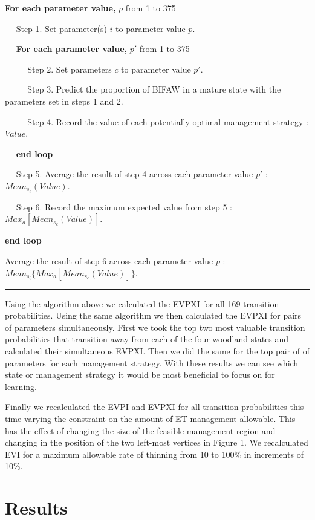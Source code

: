 \documentclass[]{article}
\begin{document}
\textbf{For each parameter value,} \(p\) from 1 to 375

\(\quad\) Step 1. Set parameter(s) \(i\) to parameter value \(p\).

\(\quad\) \textbf{For each parameter value,} \(p'\) from 1 to 375

\(\quad\) \(\quad\) Step 2. Set parameters \(c\) to parameter value
\(p'\).

\(\quad\) \(\quad\) Step 3. Predict the proportion of BIFAW in a mature
state with the parameters set in steps 1 and 2.

\(\quad\) \(\quad\) Step 4. Record the value of each potentially optimal
management strategy : \(Value\).

\(\quad\) \textbf{end loop}

\(\quad\) Step 5. Average the result of step 4 across each parameter
value \(p'\) : \(Mean_{s_c}(Value)\).

\(\quad\) Step 6. Record the maximum expected value from step 5 :
\(Max_a[Mean_{s_c}(Value)]\).

\textbf{end loop}

Average the result of step 6 across each parameter value \(p\) :
\(Mean_{s_i}\{Max_a[Mean_{s_c}(Value)]\}\).

\begin{center}\rule{0.5\linewidth}{\linethickness}\end{center}

Using the algorithm above we calculated the EVPXI for all 169 transition
probabilities. Using the same algorithm we then calculated the EVPXI for
pairs of parameters simultaneously. First we took the top two most
valuable transition probabilities that transition away from each of the
four woodland states and calculated their simultaneous EVPXI. Then we
did the same for the top pair of of parameters for each management
strategy. With these results we can see which state or management
strategy it would be most beneficial to focus on for learning.

Finally we recalculated the EVPI and EVPXI for all transition
probabilities this time varying the constraint on the amount of ET
management allowable. This has the effect of changing the size of the
feasible management region and changing in the position of the two
left-most vertices in Figure 1. We recalculated EVI for a maximum
allowable rate of thinning from 10 to 100\% in increments of 10\%.
\newpage

\section{Results}\label{results}
\end{document}

